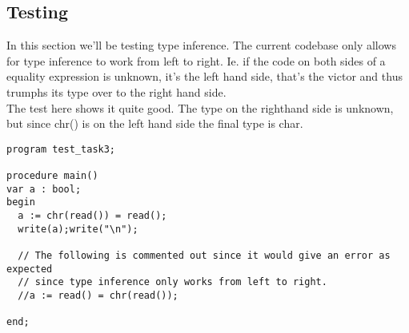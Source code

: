 \subsection{Testing}
In this section we'll be testing type inference. The current codebase only
allows for type inference to work from left to right. Ie. if the code on both
sides of a equality expression is unknown, it's the left hand side, that's the
victor and thus trumphs its type over to the right hand side.\\
The test here shows it quite good. The type on the righthand side is unknown,
but since chr() is on the left hand side the final type is char.


\begin{lstlisting}[style=MLStyle]
program test_task3;

procedure main()
var a : bool;
begin
  a := chr(read()) = read();
  write(a);write("\n");

  // The following is commented out since it would give an error as expected
  // since type inference only works from left to right.
  //a := read() = chr(read());

end;
\end{lstlisting}

